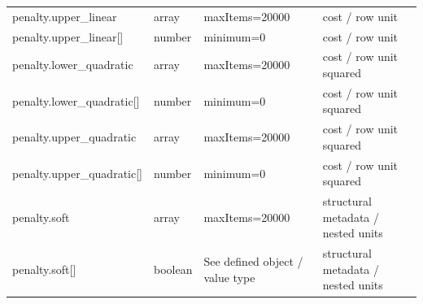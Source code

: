 \begin{longtable}{@{}>{\raggedright\arraybackslash}p{}>{\raggedright\arraybackslash}p{}>{\raggedright\arraybackslash}p{}>{\raggedright\arraybackslash}p{}@{}}
penalty.\allowbreak{}upper\_\allowbreak{}linear & array & maxItems=\allowbreak{}20000 & cost /\allowbreak{} row unit\\
penalty.\allowbreak{}upper\_\allowbreak{}linear[] & number & minimum=\allowbreak{}0 & cost /\allowbreak{} row unit\\
penalty.\allowbreak{}lower\_\allowbreak{}quadratic & array & maxItems=\allowbreak{}20000 & cost /\allowbreak{} row unit squared\\
penalty.\allowbreak{}lower\_\allowbreak{}quadratic[] & number & minimum=\allowbreak{}0 & cost /\allowbreak{} row unit squared\\
penalty.\allowbreak{}upper\_\allowbreak{}quadratic & array & maxItems=\allowbreak{}20000 & cost /\allowbreak{} row unit squared\\
penalty.\allowbreak{}upper\_\allowbreak{}quadratic[] & number & minimum=\allowbreak{}0 & cost /\allowbreak{} row unit squared\\
penalty.\allowbreak{}soft & array & maxItems=\allowbreak{}20000 & structural metadata /\allowbreak{} nested units\\
penalty.\allowbreak{}soft[] & boolean & See defined object /\allowbreak{} value type & structural metadata /\allowbreak{} nested units\\
\end{longtable}\endgroup
